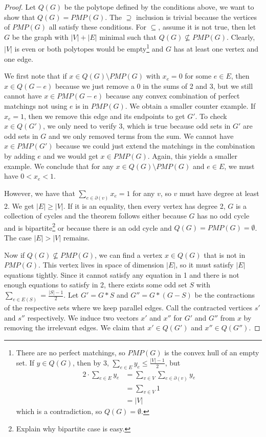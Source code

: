 \documentclass{tufte-handout}
\theoremstyle{definition}
\theoremstyle{remark}
\begin{document}
\begin{proof}
	Let $Q(G)$ be the polytope defined by the conditions above, we want to show that $Q(G) = PMP(G)$. The $\supseteq$ inclusion is trivial because the vertices of $PMP(G)$ all satisfy these conditions. For $\subseteq$, assume it is not true, then let $G$ be the graph with $|V| + |E|$ minimal such that $Q(G) \not\subseteq PMP(G)$. Clearly, $|V|$ is even or both polytopes would be empty\footnote{There are no perfect matchings, so $PMP(G)$ is the convex hull of an empty set. If $y \in Q(G)$, then by 3, $\sum_{e \in E} y_e \leq \frac{|V|-1}{2}$, but \begin{align*}
		2\cdot\sum_{e \in E} y_e&= \sum_{v \in V}\sum_{e \in \partial(v)} y_e\\ &= \sum_{v \in V} 1\\ &= |V|
	\end{align*}
which is a contradiction, so $Q(G) = \emptyset$.} and $G$ has at least one vertex and one edge.
	
	We first note that if $x \in Q(G) \setminus PMP(G)$ with $x_e= 0$ for some $e \in E$, then $x \in Q(G-e)$ because we just remove a 0 in the sums of 2 and 3, but we still cannot have $x \in PMP(G-e)$ because any convex combination of perfect matchings not using $e$ is in $PMP(G)$. We obtain a smaller counter example. If $x_e = 1$, then we remove this edge and its endpoints to get $G'$. To check $x \in Q(G')$, we only need to verify 3, which is true because odd sets in $G'$ are odd sets in $G$ and we only removed terms from the sum. We cannot have $x \in PMP(G')$ because we could just extend the matchings in the combination by adding $e$ and we would get $x \in PMP(G)$. Again, this yields a smaller example. We conclude that for any $x \in Q(G)\setminus PMP(G)$ and $e \in E$, we must have $0<x_e< 1$.
	
	However, we have that $\sum_{e \in \partial(v)} x_e =1$ for any $v$, so $v$ must have degree at least 2. We get $|E| \geq |V|$. If it is an equality, then every vertex has degree 2, $G$ is a collection of cycles and the theorem follows either because $G$ has no odd cycle and is bipartite\footnote{Explain why bipartite case is easy.} or because there is an odd cycle and $Q(G) = PMP(G) = \emptyset$. The case $|E| > |V|$ remains.
	
	Now if $Q(G) \not\subseteq PMP(G)$, we can find a vertex $x \in Q(G)$ that is not in $PMP(G)$. This vertex lives in space of dimension $|E|$, so it must satisfy $|E|$ equations tightly. Since it cannot satisfy any equation in 1 and there is not enough equations to satisfy in 2, there exists some odd set $S$ with $\sum_{e \in E(S)} = \frac{|S|-1}{2}$. Let $G' = G*S$ and $G''= G*(G- S)$ be the contractions of the respective sets where we keep parallel edges. Call the contracted vertices $s'$ and $s''$ respectively. We induce two vectors $x'$ and $x''$ for $G'$ and $G''$ from $x$ by removing the irrelevant edges. We claim that $x' \in Q(G')$ and $x'' \in Q(G'')$.
	

\end{proof}
\end{document}
